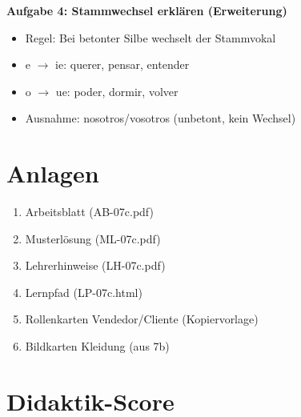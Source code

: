 \documentclass[11pt,a4paper]{article}
\begin{document}
\textbf{Aufgabe 4: Stammwechsel erklären (Erweiterung)}
\begin{itemize}
    \item Regel: Bei betonter Silbe wechselt der Stammvokal
    \item e $\rightarrow$ ie: querer, pensar, entender
    \item o $\rightarrow$ ue: poder, dormir, volver
    \item Ausnahme: nosotros/vosotros (unbetont, kein Wechsel)
\end{itemize}

\section{Anlagen}

\begin{enumerate}
    \item Arbeitsblatt (AB-07c.pdf)
    \item Musterlösung (ML-07c.pdf)
    \item Lehrerhinweise (LH-07c.pdf)
    \item Lernpfad (LP-07c.html)
    \item Rollenkarten Vendedor/Cliente (Kopiervorlage)
    \item Bildkarten Kleidung (aus 7b)
\end{enumerate}

\newpage
\section{Didaktik-Score}
\end{document}
